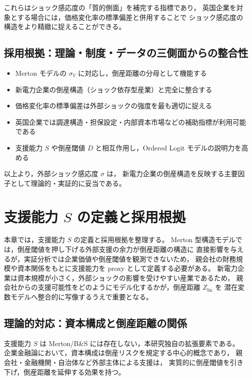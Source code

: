 これらはショック感応度の「質的側面」を補完する指標であり，
英国企業を対象とする場合には，価格変化率の標準偏差と併用することで
ショック感応度の構造をより精緻に捉えることができる。

\subsection{採用根拠：理論・制度・データの三側面からの整合性}

\begin{itemize}
    \item Merton モデルの $\sigma_V$ に対応し，倒産距離の分母として機能する
    \item 新電力企業の倒産構造（ショック依存型産業）と完全に整合する
    \item 価格変化率の標準偏差は外部ショックの強度を最も適切に捉える
    \item 英国企業では調達構造・担保設定・内部資本市場などの補助指標が利用可能である
    \item 支援能力 $S$ や倒産閾値 $D$ と相互作用し，Ordered Logit モデルの説明力を高める
\end{itemize}

以上より，外部ショック感応度 $\sigma$ は，
新電力企業の倒産構造を反映する主要因子として理論的・実証的に妥当である。

\section{支援能力 $S$ の定義と採用根拠}
\label{sec:s_theoretical}

本章では，支援能力 $S$ の定義と採用根拠を整理する。
Merton 型構造モデルでは，倒産閾値を押し下げる外部支援の余力が倒産距離の構造に
直接影響を与えるが，実証分析では企業価値や倒産閾値を観測できないため，
親会社の財務規模や資本関係をもとに支援能力を proxy として定義する必要がある。
新電力企業は資本規模が小さく，外部ショックの影響を受けやすい産業であるため，
親会社からの支援可能性をどのようにモデル化するかが，倒産距離 $Z_{\text{lin}}$ を
潜在変数モデルへ整合的に写像するうえで重要となる。

\subsection{理論的対応：資本構成と倒産距離の関係}

支援能力 $S$ は Merton/B\&S には存在しない，本研究独自の拡張要素である。
企業金融論において，資本構成は倒産リスクを規定する中心的概念であり，
親会社・金融機関・自治体など外部主体による支援は，
実質的に倒産閾値を引き下げ，倒産距離を延伸する効果を持つ。

